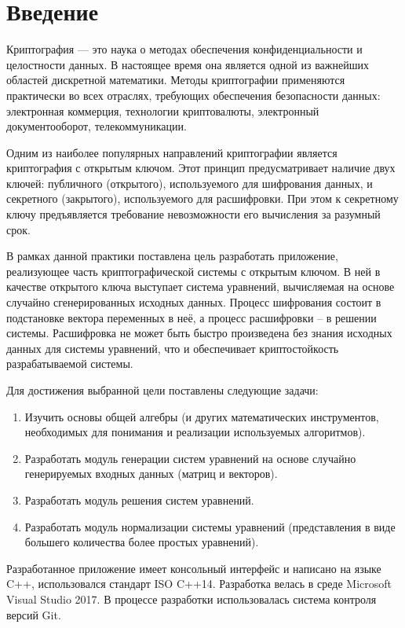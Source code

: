 \chapter*{Введение} %

Криптография --- это наука о методах обеспечения конфиденциальности и целостности данных. В настоящее время она является одной из важнейших областей дискретной математики. Методы криптографии применяются практически во всех отраслях, требующих обеспечения безопасности данных: электронная коммерция, технологии криптовалюты, электронный документооборот, телекоммуникации.


Одним из наиболее популярных направлений криптографии является криптография с открытым ключом. Этот принцип предусматривает наличие двух ключей: публичного (открытого), используемого для шифрования данных, и секретного (закрытого), используемого для расшифровки. При этом к секретному ключу предъявляется требование невозможности его вычисления за разумный срок.


В рамках данной практики поставлена цель разработать приложение, реализующее часть криптографической системы с открытым ключом. В ней в качестве открытого ключа выступает система уравнений, вычисляемая на основе случайно сгенерированных исходных данных. Процесс шифрования состоит в подстановке вектора переменных в неё, а процесс расшифровки – в решении системы. Расшифровка не может быть быстро произведена без знания исходных данных для системы уравнений, что и обеспечивает криптостойкость разрабатываемой системы.


Для достижения выбранной цели поставлены следующие задачи:

\begin{enumerate}
	\item Изучить основы общей алгебры (и других математических инструментов, необходимых для понимания и реализации используемых алгоритмов).
	\item Разработать модуль генерации систем уравнений на основе случайно генерируемых входных данных (матриц и векторов).
	\item Разработать модуль решения систем уравнений.
	\item Разработать модуль нормализации системы уравнений (представления в виде большего количества более простых уравнений).
\end{enumerate} 


Разработанное приложение имеет консольный интерфейс и написано на языке C++, использовался стандарт ISO C++14. Разработка велась в среде Microsoft Visual Studio 2017. В процессе разработки использовалась система контроля версий Git.

